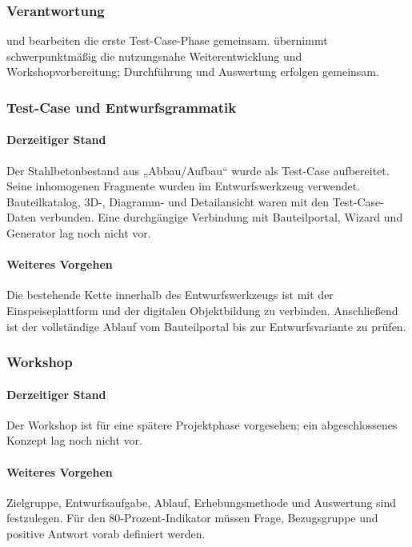 \documentclass[type=zwischenbericht]{zukunftbau}
\begin{document}
\subsubsection{Verantwortung}
 und  bearbeiten die erste Test-Case-Phase gemeinsam.  übernimmt schwerpunktmäßig die nutzungsnahe Weiterentwicklung und Workshopvorbereitung; Durchführung und Auswertung erfolgen gemeinsam.

\subsubsection{Test-Case und Entwurfsgrammatik}

\paragraph{Derzeitiger Stand}
Der Stahlbetonbestand aus „Abbau/Aufbau“ wurde als Test-Case aufbereitet. Seine inhomogenen Fragmente wurden im Entwurfswerkzeug verwendet. Bauteilkatalog, 3D-, Diagramm- und Detailansicht waren mit den Test-Case-Daten verbunden. Eine durchgängige Verbindung mit Bauteilportal, Wizard und Generator lag noch nicht vor.

\paragraph{Weiteres Vorgehen}
Die bestehende Kette innerhalb des Entwurfswerkzeugs ist mit der Einspeiseplattform und der digitalen Objektbildung zu verbinden. Anschließend ist der vollständige Ablauf vom Bauteilportal bis zur Entwurfsvariante zu prüfen.

\subsubsection{Workshop}

\paragraph{Derzeitiger Stand}
Der Workshop ist für eine spätere Projektphase vorgesehen; ein abgeschlossenes Konzept lag noch nicht vor.

\paragraph{Weiteres Vorgehen}
Zielgruppe, Entwurfsaufgabe, Ablauf, Erhebungsmethode und Auswertung sind festzulegen. Für den 80-Prozent-Indikator müssen Frage, Bezugsgruppe und positive Antwort vorab definiert werden.
\end{document}
